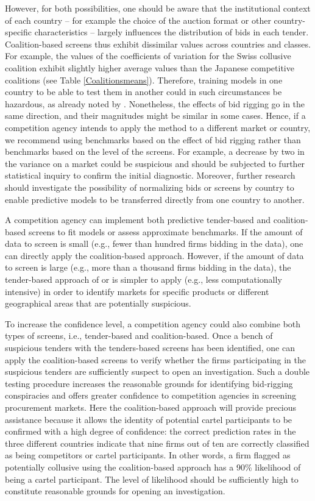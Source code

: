 \documentclass[a4paper,11pt]{article}
\begin{document}
	However, for both possibilities, one should be aware that the institutional context of each country – for example the choice of the auction format or other country-specific characteristics – largely influences the distribution of bids in each tender. Coalition-based screens thus exhibit dissimilar values across countries and classes. For example, the values of the coefficients of variation for the Swiss collusive coalition exhibit slightly higher average values than the Japanese competitive coalitions (see Table \ref{Coalitionsmeans}). Therefore, training models in one country to be able to test them in another could in such circumstances be hazardous, as already noted by \cite{huber2020transnational}. Nonetheless, the effects of bid rigging go in the same direction, and their magnitudes might be similar in some cases. Hence, if a competition agency intends to apply the method to a different market or country, we recommend using benchmarks based on the effect of bid rigging rather than benchmarks based on the level of the screens. For example, a decrease by two in the variance on a market could be suspicious and should be subjected to further statistical inquiry to confirm the initial diagnostic. Moreover, further research should investigate the possibility of normalizing bids or screens by country to enable predictive models to be transferred directly from one country to another.
	
	A competition agency can implement both predictive tender-based and coalition-based screens to fit models or assess approximate benchmarks. If the amount of data to screen is small (e.g., fewer than hundred firms bidding in the data), one can directly apply the coalition-based approach. However, if the amount of data to screen is large (e.g., more than a thousand firms bidding in the data), the tender-based approach of \cite{huber2019machine} or \cite{wallimann2020machine} is simpler to apply (e.g., less computationally intensive) in order to identify markets for specific products or different geographical areas that are potentially suspicious.
	
	To increase the confidence level, a competition agency could also combine both types of screens, i.e., tender-based and coalition-based. Once a bench of suspicious tenders with the tenders-based screens has been identified, one can apply the coalition-based screens to verify whether the firms participating in the suspicious tenders are sufficiently suspect to open an investigation. Such a double testing procedure increases the reasonable grounds for identifying bid-rigging conspiracies and offers greater confidence to competition agencies in screening procurement markets. Here the coalition-based approach will provide precious assistance because it allows the identity of potential cartel participants to be confirmed with a high degree of confidence: the correct prediction rates in the three different countries indicate that nine firms out of ten are correctly classified as being competitors or cartel participants. In other words, a firm flagged as potentially collusive using the coalition-based approach has a 90\% likelihood of being a cartel participant. The level of likelihood should be sufficiently high to constitute reasonable grounds for opening an investigation. 
	
\end{document}
